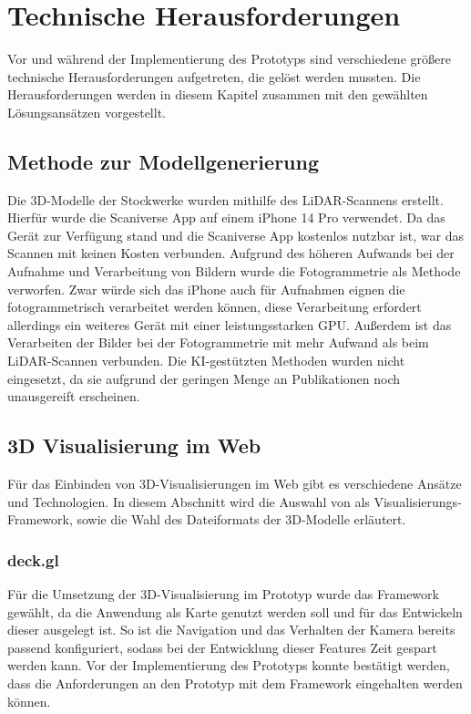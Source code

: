 \newpage
\section{Technische Herausforderungen}
Vor und während der Implementierung des Prototyps sind verschiedene größere technische Herausforderungen aufgetreten, die gelöst werden mussten. Die Herausforderungen werden in diesem Kapitel zusammen mit den gewählten Lösungsansätzen vorgestellt. 

\subsection{Methode zur Modellgenerierung}
Die 3D-Modelle der Stockwerke wurden mithilfe des LiDAR-Scannens erstellt. Hierfür wurde die Scaniverse App auf einem iPhone 14 Pro verwendet. Da das Gerät zur Verfügung stand und die Scaniverse App kostenlos nutzbar ist, war das Scannen mit keinen Kosten verbunden. Aufgrund des höheren Aufwands bei der Aufnahme und Verarbeitung von Bildern wurde die Fotogrammetrie als Methode verworfen. Zwar würde sich das iPhone auch für Aufnahmen eignen die fotogrammetrisch verarbeitet werden können, diese Verarbeitung erfordert allerdings ein weiteres Gerät mit einer leistungsstarken \ac{GPU}. Außerdem ist das Verarbeiten der Bilder bei der Fotogrammetrie mit mehr Aufwand als beim \ac{LiDAR}-Scannen verbunden. Die \ac{KI}-gestützten Methoden wurden nicht eingesetzt, da sie aufgrund der geringen Menge an Publikationen noch unausgereift erscheinen.

\subsection{3D Visualisierung im Web}
Für das Einbinden von 3D-Visualisierungen im Web gibt es verschiedene Ansätze und Technologien. In diesem Abschnitt wird die Auswahl von \deckgl{} als Visualisierungs-Framework, sowie die Wahl des Dateiformats der 3D-Modelle erläutert.

\subsubsection{deck.gl}
Für die Umsetzung der 3D-Visualisierung im Prototyp wurde das Framework \deckgl{} gewählt, da die Anwendung als Karte genutzt werden soll und \deckgl{} für das Entwickeln dieser ausgelegt ist. So ist die Navigation und das Verhalten der Kamera bereits passend konfiguriert, sodass bei der Entwicklung dieser Features Zeit gespart werden kann. Vor der Implementierung des Prototyps konnte bestätigt werden, dass die Anforderungen an den Prototyp mit dem Framework eingehalten werden können.

